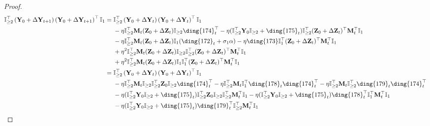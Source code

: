 \documentclass{article}
\theoremstyle{plain}
\theoremstyle{remark}
\def\bY{\mathbf{Y}}
\def\bZ{\mathbf{Z}}
\newcommand{\cc}[1]{\text{\ding{\number\numexpr#1 + 171\relax}}}
\begin{document}
\begin{proof}
    \begin{align*}
        \mathbb{I}_{\ge2}^\top\left(\bY_0+\Delta\bY_{t+1}\right)\left(\bY_0+\Delta\bY_{t+1}\right)^\top\mathbb{I}_{1}
        &=
            \mathbb{I}_{\ge2}^\top\left(\bY_0+\Delta\bY_t\right)\left(\bY_0+\Delta\bY_t\right)^\top\mathbb{I}_{1}
        \\
        &~~~~
            -\eta\mathbb{I}_{\ge2}^\top\mathbf{M}_t(\bZ_0+\Delta\bZ_t)\mathbb{I}_{\ge2}\cc{3}_t^\top
            -\eta(\mathbb{I}_{\ge2}^\top\bY_0\mathbb{I}_{\ge2}+\cc{4}_t)\mathbb{I}_{\ge2}^\top(\bZ_0+\Delta\bZ_t)^\top\mathbf{M}_t^\top\mathbb{I}_{1}
        \\
        &~~~~
            -\eta\mathbb{I}_{\ge2}^\top\mathbf{M}_t(\bZ_0+\Delta\bZ_t)\mathbb{I}_{1}(\cc{1}_t+\sigma_1\alpha) 
            -\eta\cc{2}\mathbb{I}_{1}^\top(\bZ_0+\Delta\bZ_t)^\top\mathbf{M}_t^\top\mathbb{I}_{1}
        \\
        &~~~~
            +\eta^2\mathbb{I}_{\ge2}^\top\mathbf{M}_t(\bZ_0+\Delta\bZ_t)\mathbb{I}_{\ge2}\mathbb{I}_{\ge2}^\top(\bZ_0+\Delta\bZ_t)^\top\mathbf{M}_t^\top\mathbb{I}_{1}
        \\
        &~~~~
            +\eta^2\mathbb{I}_{\ge2}^\top\mathbf{M}_t(\bZ_0+\Delta\bZ_t)\mathbb{I}_{1}\mathbb{I}_{1}^\top(\bZ_0+\Delta\bZ_t)^\top\mathbf{M}_t^\top\mathbb{I}_{1}
        \\
        &=
            \mathbb{I}_{\ge2}^\top\left(\bY_0+\Delta\bY_t\right)\left(\bY_0+\Delta\bY_t\right)^\top\mathbb{I}_{1}
        \\
        &~~~~
            -\eta\mathbb{I}_{\ge2}^\top\mathbf{M}_t\mathbb{I}_{\ge2}\mathbb{I}_{\ge2}^\top\bZ_0\mathbb{I}_{\ge2}\cc{3}_t^\top
            -\eta\mathbb{I}_{\ge2}^\top\mathbf{M}_t\mathbb{I}_{1}^\top\cc{7}_t\cc{3}_t^\top
            -\eta\mathbb{I}_{\ge2}^\top\mathbf{M}_t\mathbb{I}_{\ge2}^\top\cc{8}_t\cc{3}_t^\top
        \\
        &~~~~
            -\eta(\mathbb{I}_{\ge2}^\top\bY_0\mathbb{I}_{\ge2}+\cc{4}_t)\mathbb{I}_{\ge2}^\top\bZ_0\mathbb{I}_{\ge2}\mathbb{I}_{\ge2}^\top\mathbf{M}_t^\top\mathbb{I}_{1}
            -\eta(\mathbb{I}_{\ge2}^\top\bY_0\mathbb{I}_{\ge2}+\cc{4}_t)\cc{7}_t^\top \mathbb{I}_{1}^\top \mathbf{M}_t^\top\mathbb{I}_{1}
        \\
        &~~~~
            -\eta(\mathbb{I}_{\ge2}^\top\bY_0\mathbb{I}_{\ge2}+\cc{4}_t)\cc{8}_t^\top \mathbb{I}_{\ge2}^\top \mathbf{M}_t^\top\mathbb{I}_{1}

\end{align*}
\end{proof}
\end{document}

